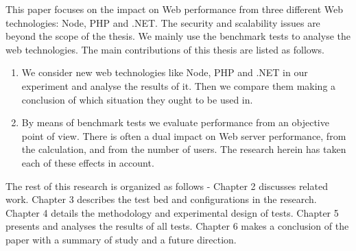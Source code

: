 \documentclass[../thesis.tex]{subfiles}
\begin{document}
\vspace{5mm}
This paper focuses on the impact on Web performance from three different Web technologies: Node, PHP and .NET. The security and scalability issues are beyond the scope of the thesis. We mainly use the benchmark tests to analyse the web technologies. The main contributions of this thesis are listed as follows. 
\vspace{5mm}
\begin{enumerate}
    \item We consider new web technologies like Node, PHP and .NET in our experiment and analyse the results of it. Then we compare them making a conclusion of which situation they ought to be used in. 
    \item By means of benchmark tests we evaluate performance from an objective point of view. There is often a dual impact on Web server performance, from the calculation, and from the number of users. The research herein has taken each of these effects in account.
\end{enumerate} 
\vspace{5mm}

The rest of this research is organized as follows - Chapter 2 discusses related work. Chapter 3 describes the test bed and configurations in the research. Chapter 4 details the methodology and experimental design of tests. Chapter 5 presents and analyses the results of all tests. Chapter 6 makes a conclusion of the paper with a summary of study and a future direction.
\end{document}
